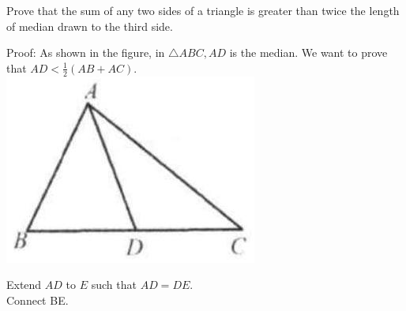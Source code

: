 \documentclass{article}
\begin{document}
Prove that the sum of any two sides of a triangle is greater than twice the length of median drawn to the third side.

Proof:
As shown in the figure, in \(\triangle A B C, A D\) is the median. We want to prove that \(A D<\frac{1}{2}(A B+A C)\).\\
\centering
\includegraphics[width=\textwidth]{images/023(1).jpg}

Extend \(A D\) to \(E\) such that \(A D=D E\).\\
Connect BE.
\end{document}
